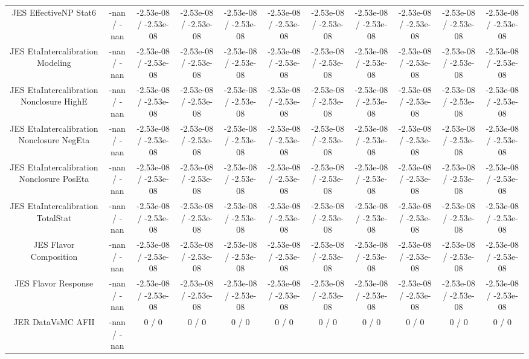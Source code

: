 \begin{table}[htbp]
\begin{center}
\begin{tabular}{|c|c|c|c|c|c|c|c|c|c|c|}
  JES EffectiveNP Stat6 & -nan / -nan & -2.53e-08 / -2.53e-08 & -2.53e-08 / -2.53e-08 & -2.53e-08 / -2.53e-08 & -2.53e-08 / -2.53e-08 & -2.53e-08 / -2.53e-08 & -2.53e-08 / -2.53e-08 & -2.53e-08 / -2.53e-08 & -2.53e-08 / -2.53e-08 & -2.53e-08 / -2.53e-08 \\ 
  JES EtaIntercalibration Modeling & -nan / -nan & -2.53e-08 / -2.53e-08 & -2.53e-08 / -2.53e-08 & -2.53e-08 / -2.53e-08 & -2.53e-08 / -2.53e-08 & -2.53e-08 / -2.53e-08 & -2.53e-08 / -2.53e-08 & -2.53e-08 / -2.53e-08 & -2.53e-08 / -2.53e-08 & -2.53e-08 / -2.53e-08 \\ 
  JES EtaIntercalibration Nonclosure HighE & -nan / -nan & -2.53e-08 / -2.53e-08 & -2.53e-08 / -2.53e-08 & -2.53e-08 / -2.53e-08 & -2.53e-08 / -2.53e-08 & -2.53e-08 / -2.53e-08 & -2.53e-08 / -2.53e-08 & -2.53e-08 / -2.53e-08 & -2.53e-08 / -2.53e-08 & -2.53e-08 / -2.53e-08 \\ 
  JES EtaIntercalibration Nonclosure NegEta & -nan / -nan & -2.53e-08 / -2.53e-08 & -2.53e-08 / -2.53e-08 & -2.53e-08 / -2.53e-08 & -2.53e-08 / -2.53e-08 & -2.53e-08 / -2.53e-08 & -2.53e-08 / -2.53e-08 & -2.53e-08 / -2.53e-08 & -2.53e-08 / -2.53e-08 & -2.53e-08 / -2.53e-08 \\ 
  JES EtaIntercalibration Nonclosure PosEta & -nan / -nan & -2.53e-08 / -2.53e-08 & -2.53e-08 / -2.53e-08 & -2.53e-08 / -2.53e-08 & -2.53e-08 / -2.53e-08 & -2.53e-08 / -2.53e-08 & -2.53e-08 / -2.53e-08 & -2.53e-08 / -2.53e-08 & -2.53e-08 / -2.53e-08 & -2.53e-08 / -2.53e-08 \\ 
  JES EtaIntercalibration TotalStat & -nan / -nan & -2.53e-08 / -2.53e-08 & -2.53e-08 / -2.53e-08 & -2.53e-08 / -2.53e-08 & -2.53e-08 / -2.53e-08 & -2.53e-08 / -2.53e-08 & -2.53e-08 / -2.53e-08 & -2.53e-08 / -2.53e-08 & -2.53e-08 / -2.53e-08 & -2.53e-08 / -2.53e-08 \\ 
  JES Flavor Composition & -nan / -nan & -2.53e-08 / -2.53e-08 & -2.53e-08 / -2.53e-08 & -2.53e-08 / -2.53e-08 & -2.53e-08 / -2.53e-08 & -2.53e-08 / -2.53e-08 & -2.53e-08 / -2.53e-08 & -2.53e-08 / -2.53e-08 & -2.53e-08 / -2.53e-08 & -2.53e-08 / -2.53e-08 \\ 
  JES Flavor Response & -nan / -nan & -2.53e-08 / -2.53e-08 & -2.53e-08 / -2.53e-08 & -2.53e-08 / -2.53e-08 & -2.53e-08 / -2.53e-08 & -2.53e-08 / -2.53e-08 & -2.53e-08 / -2.53e-08 & -2.53e-08 / -2.53e-08 & -2.53e-08 / -2.53e-08 & -2.53e-08 / -2.53e-08 \\ 
  JER DataVsMC AFII & -nan / -nan & 0 / 0 & 0 / 0 & 0 / 0 & 0 / 0 & 0 / 0 & 0 / 0 & 0 / 0 & 0 / 0 & 0 / 0 \\ 

\end{tabular}
\end{center}
\end{table}
